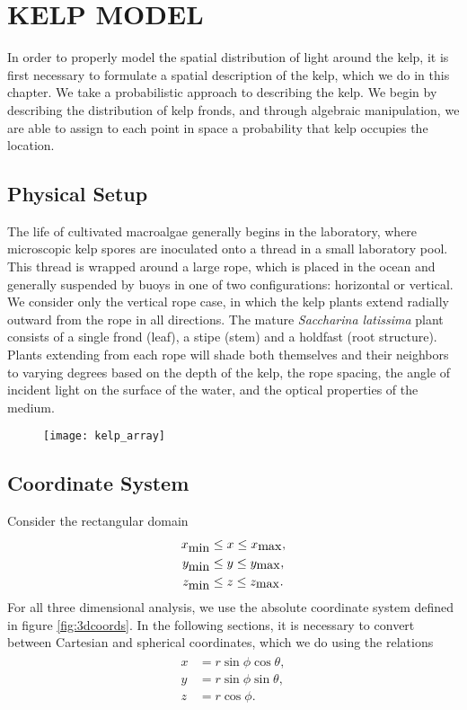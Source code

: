 \chapter{KELP MODEL}
\label{chap:kelp}

In order to properly model the spatial distribution of light around the kelp, it is first necessary to formulate a spatial description of the kelp, which we do in this chapter.
We take a probabilistic approach to describing the kelp.
We begin by describing the distribution of kelp fronds, and through algebraic manipulation, we are able to assign to each point in space a probability that kelp occupies the location.

\section{Physical Setup}
The life of cultivated macroalgae generally begins in the laboratory, where microscopic kelp spores are inoculated onto a thread in a small laboratory pool. %
This thread is wrapped around a large rope, which is placed in the ocean and generally suspended by buoys in one of two configurations: horizontal or vertical.
We consider only the vertical rope case, in which the kelp plants extend radially outward from the rope in all directions.
The mature \textit{Saccharina latissima} plant consists of a single frond (leaf), a stipe (stem) and a holdfast (root structure).
Plants extending from each rope will shade both themselves and their neighbors
to varying degrees based on the depth of the kelp, the rope spacing, the angle
of incident light on the surface of the water, and the optical properties of the medium.

\begin{figure}[H]
	\centering
	\texttt{[image: kelp\_array]}
\end{figure}

\section{Coordinate System}
Consider the rectangular domain
\begin{align*}
  x_{\mbox{min}} &\leq x \leq x_{\mbox{max}}, \\
  y_{\mbox{min}} &\leq y \leq y_{\mbox{max}}, \\
  z_{\mbox{min}} &\leq z \leq z_{\mbox{max}}.
\end{align*}
For all three dimensional analysis, we use the absolute coordinate system defined in figure \ref{fig:3dcoords}.
In the following sections, it is necessary to convert between Cartesian and spherical coordinates, which we do using the relations
\begin{align}
	\begin{split}
		x & = r\sin\phi\cos\theta, \\
		y & = r\sin\phi\sin\theta, \\
		z & = r\cos\phi. \\
	\label{eqn:coords}
	\end{split}
\end{align}

